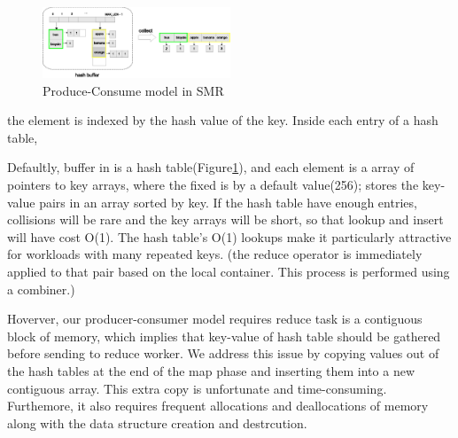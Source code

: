 \begin{figure}[!h!t]  
	\centering
	\includegraphics[width=0.5\textwidth]{eps/dmr_hash_buffer.eps}
	\caption{Produce-Consume model in SMR}
	\label{fig:dmr:hash-buffer}
\end{figure}
the element is indexed by the hash value of the key.
Inside each entry of a hash table,

Defaultly, buffer in \myds is a hash table(Figure\ref{fig:dmr:hash-buffer}), 
and each element is a array of pointers to key arrays,
where the fixed is by a default value(256);
\myds stores the key-value pairs in an array sorted by key.
If the hash table have enough entries, 
collisions will be rare and the key arrays will be short,
so that lookup and insert will have cost O(1).
The hash table's O(1) lookups 
make it particularly attractive for workloads with many repeated keys.
{\color{gray}(the reduce operator is immediately applied
	to that pair based on the local container. This process is
	performed using a combiner.)}


Hoverver, our producer-consumer model requires
reduce task is a contiguous block of memory, 
which implies that key-value of hash table should be gathered
before sending to reduce worker.
We address this issue by 
copying values out of the hash tables
at the end of the map phase and 
inserting them into a new contiguous array.
This extra copy is unfortunate and time-consuming.
Furthemore, it also requires frequent allocations and deallocations of memory 
along with the data structure creation and destrcution.


